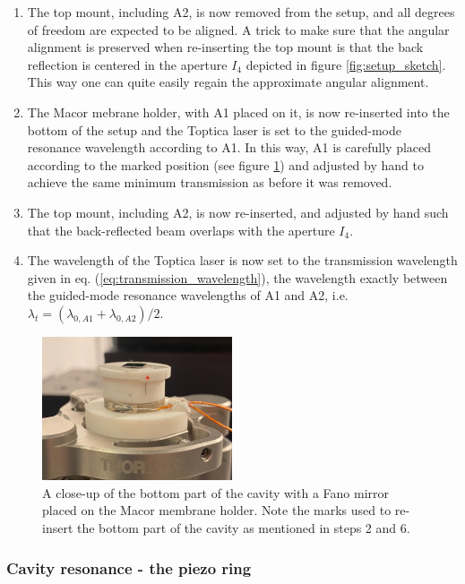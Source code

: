 \begin{enumerate}
    \item The top mount, including A2, is now removed from the setup, and all degrees of freedom are expected to be aligned. A trick to make sure that the angular alignment is preserved when re-inserting the top mount is that the back reflection is centered in the aperture $I_4$ depicted in figure \ref{fig:setup_sketch}. This way one can quite easily regain the approximate angular alignment.
    \item The Macor mebrane holder, with A1 placed on it, is now re-inserted into the bottom of the setup and the Toptica laser is set to the guided-mode resonance wavelength according to A1. In this way, A1 is carefully placed according to the marked position (see figure \ref{fig:bottom_with_alignment_mark}) and adjusted by hand to achieve the same minimum transmission as before it was removed. 
    \item The top mount, including A2, is now re-inserted, and adjusted by hand such that the back-reflected beam overlaps with the aperture $I_4$. 
    \item The wavelength of the Toptica laser is now set to the transmission wavelength given in eq. (\ref{eq:transmission_wavelength}), the wavelength exactly between the guided-mode resonance wavelengths of A1 and A2, i.e. $\lambda_t = (\lambda_{0,A1} + \lambda_{0,A2})/2$. 
\end{enumerate}

\begin{figure}[h!]
    \centering
    \includegraphics[width=0.5\textwidth]{figures/bottom_with_alignement_mark.pdf}
    \caption{A close-up of the bottom part of the cavity with a Fano mirror placed on the Macor membrane holder. Note the marks used to re-insert the bottom part of the cavity as mentioned in steps 2 and 6.}
    \label{fig:bottom_with_alignment_mark}
\end{figure}

\subsubsection{Cavity resonance - the piezo ring}

